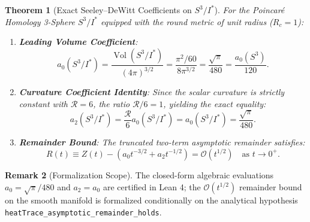 \documentclass[11pt,a4paper]{article}
\newtheorem{theorem}{Theorem}[section]
\theoremstyle{definition}
\newtheorem{remark}[theorem]{Remark}
\DeclareMathOperator{\Vol}{Vol}
\begin{document}
\begin{theorem}[Exact Seeley--DeWitt Coefficients on $S^3 / I^*$]
For the Poincar\'e Homology 3-Sphere $S^3 / I^*$ equipped with the round metric of unit radius ($R_c = 1$):
\begin{enumerate}
\item \textbf{Leading Volume Coefficient}:
\begin{equation}
a_0(S^3 / I^*) = \frac{\Vol(S^3 / I^*)}{(4 \pi)^{3/2}} = \frac{\pi^2 / 60}{8 \pi^{3/2}} = \frac{\sqrt{\pi}}{480} = \frac{a_0(S^3)}{120}.
\end{equation}
\item \textbf{Curvature Coefficient Identity}: Since the scalar curvature is strictly constant with $\mathcal{R} = 6$, the ratio $\mathcal{R}/6 = 1$, yielding the exact equality:
\begin{equation}
a_2(S^3 / I^*) = \frac{\mathcal{R}}{6} a_0(S^3 / I^*) = a_0(S^3 / I^*) = \frac{\sqrt{\pi}}{480}.
\end{equation}
\item \textbf{Remainder Bound}: The truncated two-term asymptotic remainder satisfies:
\begin{equation}
R(t) \equiv Z(t) - \left( a_0 t^{-3/2} + a_2 t^{-1/2} \right) = \mathcal{O}\left(t^{1/2}\right) \quad \text{as } t \to 0^+.
\end{equation}
\end{enumerate}
\end{theorem}

\begin{remark}[Formalization Scope]
The closed-form algebraic evaluations $a_0 = \sqrt{\pi}/480$ and $a_2 = a_0$ are certified in Lean 4; the $\mathcal{O}(t^{1/2})$ remainder bound on the smooth manifold is formalized conditionally on the analytical hypothesis \texttt{heatTrace\_asymptotic\_remainder\_holds}.
\end{remark}
\end{document}
